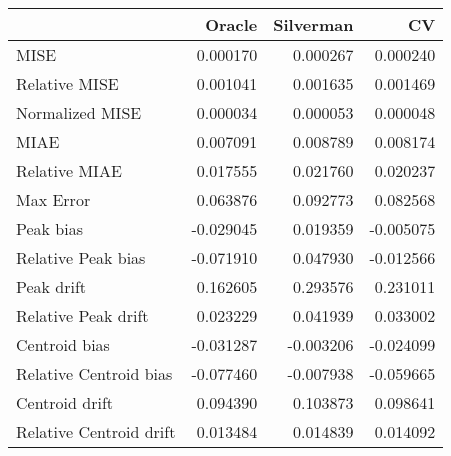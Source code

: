 \begin{tabular}{lrrr}
  \hline
 & Oracle & Silverman & CV \\ 
  \hline
MISE & 0.000170 & 0.000267 & 0.000240 \\ 
  Relative MISE & 0.001041 & 0.001635 & 0.001469 \\ 
  Normalized MISE & 0.000034 & 0.000053 & 0.000048 \\ 
  MIAE & 0.007091 & 0.008789 & 0.008174 \\ 
  Relative MIAE & 0.017555 & 0.021760 & 0.020237 \\ 
  Max Error & 0.063876 & 0.092773 & 0.082568 \\ 
  Peak bias & -0.029045 & 0.019359 & -0.005075 \\ 
  Relative Peak bias & -0.071910 & 0.047930 & -0.012566 \\ 
  Peak drift & 0.162605 & 0.293576 & 0.231011 \\ 
  Relative Peak drift & 0.023229 & 0.041939 & 0.033002 \\ 
  Centroid bias & -0.031287 & -0.003206 & -0.024099 \\ 
  Relative Centroid bias & -0.077460 & -0.007938 & -0.059665 \\ 
  Centroid drift & 0.094390 & 0.103873 & 0.098641 \\ 
  Relative Centroid drift & 0.013484 & 0.014839 & 0.014092 \\ 
   \hline
\end{tabular}
